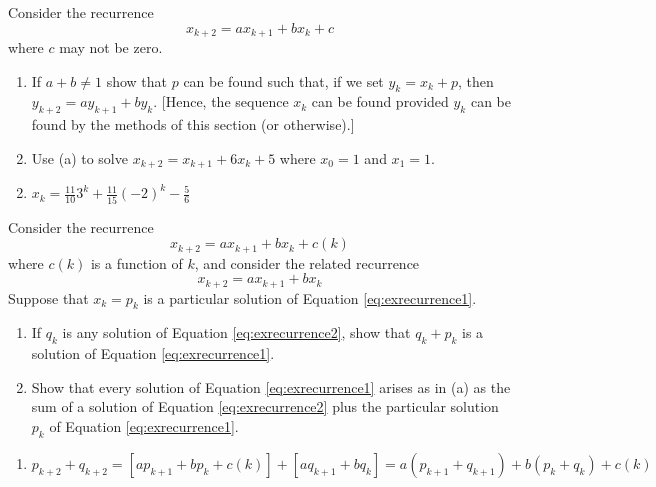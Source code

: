 \begin{multicols}{2}
\begin{ex}
Consider the recurrence 
\begin{equation*}
x_{k+2} = ax_{k+1} + bx_{k} + c
\end{equation*}
where $c$ may not be zero.


\begin{enumerate}[label={\alph*.}]
\item If $a + b \neq 1$ show that $p$ can be found such that, if we set $y_{k} = x_{k} + p$, then $y_{k+2} = ay_{k+1} + by_{k}$. [Hence, the sequence $x_{k}$ can be found provided $y_{k}$ can be found by the methods of this section (or otherwise).]

\item Use (a) to solve $x_{k+2} = x_{k+1} + 6x_{k} + 5$ where $x_{0} = 1$ and $x_{1} = 1$.

\end{enumerate}
\begin{sol}
\begin{enumerate}[label={\alph*.}]
\setcounter{enumi}{1}
\item $x_k = \frac{11}{10} 3^k + \frac{11}{15}(-2)^k - \frac{5}{6}$


\end{enumerate}
\end{sol}
\end{ex}

\begin{ex}
Consider the recurrence
\begin{equation}\label{eq:exrecurrence1}
x_{k+2} = ax_{k+1} + bx_k + c(k) 
\end{equation}
where $c(k)$ is a function of $k$, and consider the related recurrence
\begin{equation}\label{eq:exrecurrence2}
x_{k+2} = ax_{k+1} + bx_k  
\end{equation}
Suppose that $x_{k} = p_{k}$ is a particular solution of Equation \ref{eq:exrecurrence1}.


\begin{enumerate}[label={\alph*.}]
\item If $q_{k}$ is any solution of Equation \ref{eq:exrecurrence2}, show that $q_{k} + p_{k}$ is a solution of Equation \ref{eq:exrecurrence1}.

\item Show that every solution of Equation \ref{eq:exrecurrence1} arises as in (a) as the sum of a solution of Equation \ref{eq:exrecurrence2} plus the particular solution $p_{k}$ of Equation \ref{eq:exrecurrence1}.

\end{enumerate}
\begin{sol}
\begin{enumerate}[label={\alph*.}]
\item $p_{k+2} + q_{k+2} = \left[ ap_{k+1} + bp_k + c(k) \right] + \left[ aq_{k+1} + bq_k \right] = a(p_{k+1} + q_{k+1}) + b(p_k+q_k) + c(k) $ 

\end{enumerate}
\end{sol}
\end{ex}

\end{multicols}


